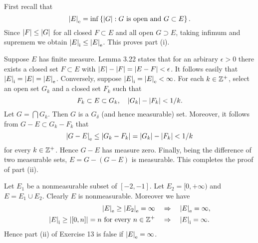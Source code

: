\begin{exercise}{3.13}
  First recall that
  \[
    \left\vert E\right\vert_\mathrm{e} = \inf \left\{ \left\vert G\right\vert : G \text{ is open and } G \subset E\right\}.
  \]
  Since $\left\vert F\right\vert \le \left\vert G\right\vert$ for all closed $F \subset E$
  and all open $G \supset E$,
  taking infimum and supremem we obtain
  $\left\vert E\right\vert_\mathrm{i} \le \left\vert E\right\vert_\mathrm{e}$.
  This proves part (i).

  Suppose $E$ has finite measure.
  Lemma 3.22 states that for an arbirary $\epsilon > 0$
  there exists a closed set $F \subset E$ with
  $\left\vert E\right\vert - \left\vert F\right\vert = \left\vert E-F\right\vert < \epsilon$.
  It follows easily that $\left\vert E\right\vert_\mathrm{i} = \left\vert E\right\vert = \left\vert E\right\vert_\mathrm{e}$.
  Conversely, suppose $\left\vert E\right\vert_\mathrm{i} = \left\vert E\right\vert_\mathrm{e} < \infty$.
  For each $k \in \mathbb{Z}^+$,
  select an open set $G_k$ and a closed set $F_k$ such that
  \[
    F_k \subset E \subset G_k, \quad \left\vert G_k\right\vert - \left\vert F_k\right\vert < 1/k.
  \]
  Let $G = \bigcap G_k$.
  Then $G$ is a $G_\delta$ (and hence measurable) set.
  Moreover, it follows from $G - E \subset G_k - F_k$ that
  \[
    \left\vert G-E\right\vert_\mathrm{e} \le \left\vert G_k - F_k\right\vert = \left\vert G_k\right\vert - \left\vert F_k\right\vert < 1/k
  \]
  for every $k \in \mathbb{Z}^+$.
  Hence $G-E$ has measure zero.
  Finally, being the difference of two measurable sets,
  $E = G - (G-E)$ is measurable.
  This completes the proof of part (ii).
\end{exercise}

\begin{exercise}{3.14}
  Let $E_1$ be a nonmeasurable subset of $[-2, -1]$.
  Let $E_2 = [0, +\infty)$ and $E = E_1 \cup E_2$.
  Clearly $E$ is nonmeasurable.
  Moreover we have
  \[
    \begin{aligned}
      \left\vert E\right\vert_\mathrm{e} \ge \left\vert E_2\right\vert_\mathrm{e} = \infty \quad &\Rightarrow \quad \left\vert E\right\vert_\mathrm{e} = \infty, \\
      \left\vert E\right\vert_\mathrm{i} \ge \left\vert[0, n]\right\vert = n \text{ for every } n \in \mathbb{Z}^+
      \quad &\Rightarrow \quad \left\vert E\right\vert_\mathrm{i} = \infty.
    \end{aligned}
  \]
  Hence part (ii) of Exercise 13 is false if $\left\vert E\right\vert_\mathrm{e} = \infty$.
\end{exercise}


